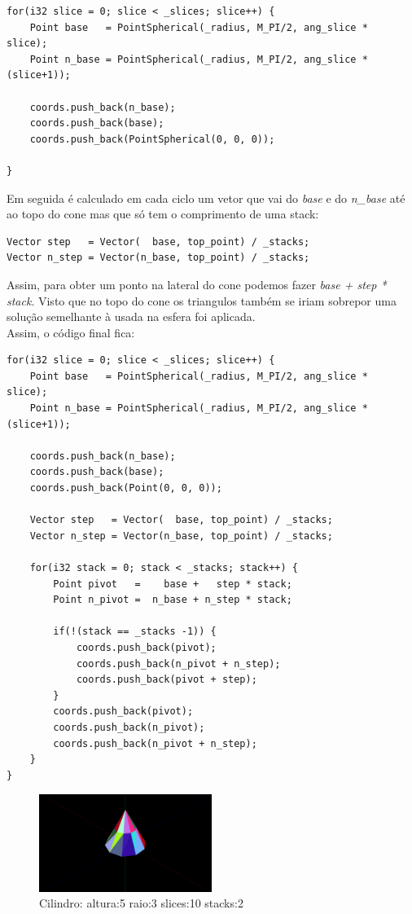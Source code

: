 \documentclass[a4paper]{report}
\begin{document}
\begin{lstlisting}
for(i32 slice = 0; slice < _slices; slice++) {
    Point base   = PointSpherical(_radius, M_PI/2, ang_slice *  slice);
    Point n_base = PointSpherical(_radius, M_PI/2, ang_slice * (slice+1));

    coords.push_back(n_base);
    coords.push_back(base);
    coords.push_back(PointSpherical(0, 0, 0));

}
\end{lstlisting}
Em seguida é calculado em cada ciclo um vetor que vai do \textit{base} e do
\textit{n\_base} até ao topo do cone mas que só tem o comprimento de uma stack:

\begin{lstlisting}
Vector step   = Vector(  base, top_point) / _stacks;
Vector n_step = Vector(n_base, top_point) / _stacks;
\end{lstlisting}
Assim, para obter um ponto na lateral do cone podemos fazer \textit{base + step
* stack}. Visto que no topo do cone os triangulos também se iriam sobrepor uma
solução semelhante à usada na esfera foi aplicada.\\
Assim, o código final fica:

\begin{lstlisting}
for(i32 slice = 0; slice < _slices; slice++) {
    Point base   = PointSpherical(_radius, M_PI/2, ang_slice *  slice);
    Point n_base = PointSpherical(_radius, M_PI/2, ang_slice * (slice+1));

    coords.push_back(n_base);
    coords.push_back(base);
    coords.push_back(Point(0, 0, 0));

    Vector step   = Vector(  base, top_point) / _stacks;
    Vector n_step = Vector(n_base, top_point) / _stacks;

    for(i32 stack = 0; stack < _stacks; stack++) {
        Point pivot   =    base +   step * stack;
        Point n_pivot =  n_base + n_step * stack;

        if(!(stack == _stacks -1)) {
            coords.push_back(pivot);
            coords.push_back(n_pivot + n_step);
            coords.push_back(pivot + step);
        }
        coords.push_back(pivot);
        coords.push_back(n_pivot);
        coords.push_back(n_pivot + n_step);
    }
}
\end{lstlisting}

\begin{figure}[H]
    \centering 
    \includegraphics[width=0.5\textwidth]{images/cone.png}  
    \caption{Cilindro: altura:5 raio:3 slices:10 stacks:2}
    \label{fig:cilindro_render}
\end{figure}
\end{document}
